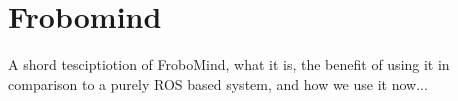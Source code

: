 \section{Frobomind \label{sec:frobomind_sec}}

A shord tesciptiotion of FroboMind, what it is, the benefit of using it in comparison to a purely ROS based system, and how we use it now...
